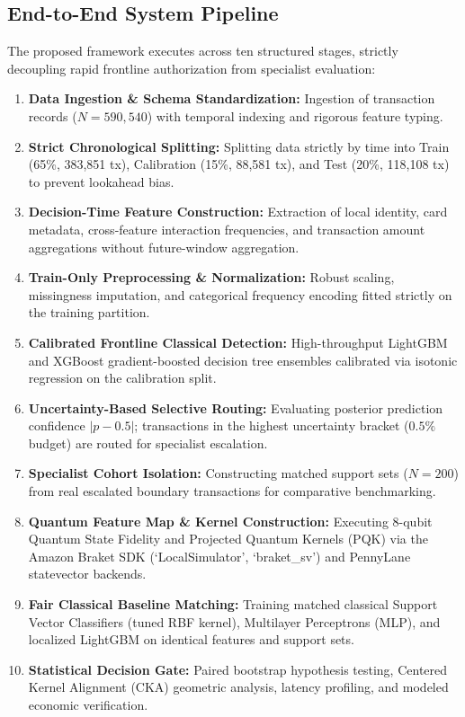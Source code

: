 \documentclass[10pt,a4paper]{article}
\begin{document}
\subsection{End-to-End System Pipeline}
The proposed framework executes across ten structured stages, strictly decoupling rapid frontline authorization from specialist evaluation:
\begin{enumerate}[leftmargin=*,itemsep=0.4pt,topsep=1pt]
\item \textbf{Data Ingestion \& Schema Standardization:} Ingestion of transaction records ($N=590,540$) with temporal indexing and rigorous feature typing.
\item \textbf{Strict Chronological Splitting:} Splitting data strictly by time into Train (65\%, 383,851 tx), Calibration (15\%, 88,581 tx), and Test (20\%, 118,108 tx) to prevent lookahead bias.
\item \textbf{Decision-Time Feature Construction:} Extraction of local identity, card metadata, cross-feature interaction frequencies, and transaction amount aggregations without future-window aggregation.
\item \textbf{Train-Only Preprocessing \& Normalization:} Robust scaling, missingness imputation, and categorical frequency encoding fitted strictly on the training partition.
\item \textbf{Calibrated Frontline Classical Detection:} High-throughput LightGBM and XGBoost gradient-boosted decision tree ensembles calibrated via isotonic regression on the calibration split.
\item \textbf{Uncertainty-Based Selective Routing:} Evaluating posterior prediction confidence $|p - 0.5|$; transactions in the highest uncertainty bracket ($0.5\%$ budget) are routed for specialist escalation.
\item \textbf{Specialist Cohort Isolation:} Constructing matched support sets ($N=200$) from real escalated boundary transactions for comparative benchmarking.
\item \textbf{Quantum Feature Map \& Kernel Construction:} Executing 8-qubit Quantum State Fidelity and Projected Quantum Kernels (PQK) via the Amazon Braket SDK (`LocalSimulator', `braket\_sv') and PennyLane statevector backends.
\item \textbf{Fair Classical Baseline Matching:} Training matched classical Support Vector Classifiers (tuned RBF kernel), Multilayer Perceptrons (MLP), and localized LightGBM on identical features and support sets.
\item \textbf{Statistical Decision Gate:} Paired bootstrap hypothesis testing, Centered Kernel Alignment (CKA) geometric analysis, latency profiling, and modeled economic verification.
\end{enumerate}
\end{document}

